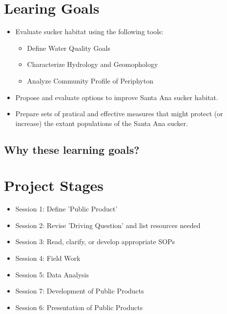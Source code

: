 \documentclass{article}\usepackage[]{graphicx}\usepackage[]{color}
\begin{document}
\section{Learing Goals}

\begin{itemize}
  \item Evaluate sucker habitat using the following tools:
  \begin{itemize}
    \item Define Water Quality Goals
    \item Characterize Hydrology and Geomophology
    \item Analyze Community Profile of Periphyton
  \end{itemize}
  \item Propose and evaluate options to improve Santa Ana sucker habitat.
  \item Prepare sets of pratical and effective measures that might protect (or increase) the extant populations of the Santa Ana sucker.
\end{itemize}

\subsection{Why these learning goals?}


\section{Project Stages}

\begin{itemize}
  \item Session 1: Define 'Public Product'
  \item Session 2: Revise 'Driving Question' and list resources needed
  \item Session 3: Read, clarify, or develop appropriate SOPs
  \item Session 4: Field Work
  \item Session 5: Data Analysis
  \item Session 7: Development of Public Products
  \item Session 6: Presentation of Public Products
\end{itemize}
\end{document}
